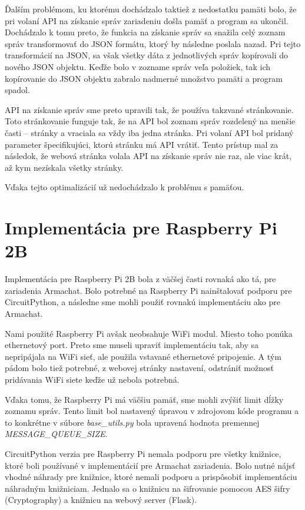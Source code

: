 \documentclass[slovak,master]{diploma}
\begin{document}
Ďalším problémom, ku ktorému dochádzalo taktiež z nedostatku pamäti bolo, že pri volaní API na získanie správ zariadeniu došla pamäť a program sa ukončil.
Dochádzalo k tomu preto, že funkcia na získanie správ sa snažila celý zoznam správ transformovať do JSON formátu, ktorý by následne poslala nazad. Pri tejto transformácií 
na JSON, sa však všetky dáta z jednotlivých správ kopírovali do nového JSON objektu. Keďže bolo v zozname správ veľa položiek, tak ich kopírovanie do JSON objektu zabralo 
nadmerné množstvo pamäti a program spadol.

API na získanie správ sme preto upravili tak, že používa takzvané stránkovanie. Toto stránkovanie funguje tak, že na API bol zoznam správ rozdelený na menšie časti -- stránky a 
vraciala sa vždy iba jedna stránka. Pri volaní API bol pridaný parameter špecifikujúci, ktorú stránku má API vrátiť. Tento prístup mal za následok, že 
webová stránka volala API na získanie správ nie raz, ale viac krát, až kym nezískala všetky stránky.

Vďaka tejto optimalizácií už nedochádzalo k problému s pamäťou.

\section{Implementácia pre Raspberry Pi 2B}
Implementácia pre Raspberry Pi 2B bola z väčšej časti rovnaká ako tá, pre zariadenia Armachat. Bolo potrebné na Raspberry Pi nainštalovať podporu pre 
CircuitPython, a následne sme mohli použiť rovnakú implementáciu ako pre Armachat.

Nami použité Raspberry Pi avšak neobsahuje WiFi modul. Miesto toho ponúka ethernetový port. Preto sme museli upraviť implementáciu tak, 
aby sa nepripájala na WiFi sieť, ale použila vstavané ethernetové pripojenie. A tým pádom bolo tiež potrebné, z webovej stránky nastavení, odstrániť možnosť 
pridávania WiFi siete keďže už nebola potrebná.

Vďaka tomu, že Raspberry Pi má väčšiu pamäť, sme mohli zvýšiť limit dĺžky zoznamu správ. Tento limit bol nastavený úpravou v zdrojovom kóde programu a to konkrétne v 
súbore \emph{base\_utils.py} bola upravená hodnota premennej \emph{MESSAGE\_QUEUE\_SIZE}.

CircuitPython verzia pre Raspberry Pi nemala podporu pre všetky knižnice, ktoré boli používané v implementácií pre Armachat zariadenia. Bolo nutné nájsť vhodné náhrady pre 
knižnice, ktoré nemali podporu a prispôsobiť implementáciu náhradným knižniciam. Jednalo sa o knižnicu na šifrovanie pomocou AES šifry (Cryptography\cite{cryptography}) a knižnicu na webový server (Flask\cite{flask}). 
\end{document}
